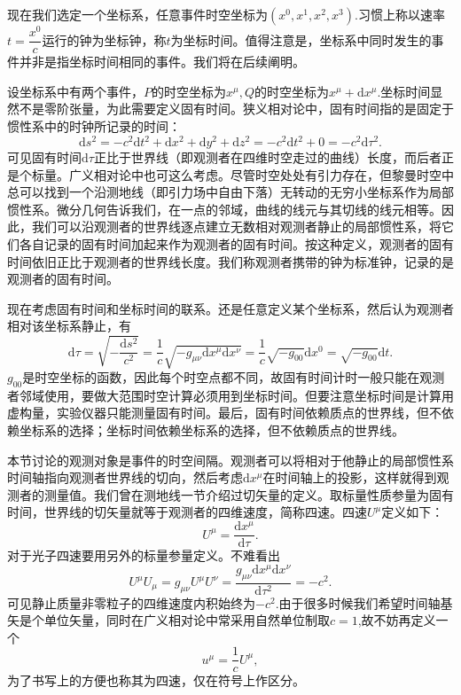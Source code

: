 \documentclass[11pt, a4paper, oneside, onecolumn]{ctexart}
\numberwithin{equation}{subsection}
\begin{document}
现在我们选定一个坐标系，任意事件时空坐标为$\left(x^{0},x^{1},x^{2},x^{3}\right)$.习惯上称以速率$t=\dfrac{x^{0}}{c}$运行的钟为坐标钟，称$t$为坐标时间。值得注意是，坐标系中同时发生的事件并非是指坐标时间相同的事件。我们将在后续阐明。

设坐标系中有两个事件，$P$的时空坐标为$x^{\mu},Q$的时空坐标为$x^{\mu}+\mathrm{d}x^{\mu}$.坐标时间显然不是零阶张量，为此需要定义固有时间。狭义相对论中，固有时间指的是固定于惯性系中的时钟所记录的时间：
\begin{equation}
\mathrm{d}s^{2}=-c^{2}\mathrm{d}t^{2}+\mathrm{d}x^{2}+\mathrm{d}y^{2}+\mathrm{d}z^{2}=-c^{2}\mathrm{d}t^{2}+0=-c^{2}\mathrm{d}\tau^{2}.
\end{equation}
可见固有时间$\mathrm{d}\tau$正比于世界线（即观测者在四维时空走过的曲线）长度，而后者正是个标量。广义相对论中也可这么考虑。尽管时空处处有引力存在，但黎曼时空中总可以找到一个沿测地线（即引力场中自由下落）无转动的无穷小坐标系作为局部惯性系。微分几何告诉我们，在一点的邻域，曲线的线元与其切线的线元相等。因此，我们可以沿观测者的世界线逐点建立无数相对观测者静止的局部惯性系，将它们各自记录的固有时间加起来作为观测者的固有时间。按这种定义，观测者的固有时间依旧正比于观测者的世界线长度。我们称观测者携带的钟为标准钟，记录的是观测者的固有时间。

现在考虑固有时间和坐标时间的联系。还是任意定义某个坐标系，然后认为观测者相对该坐标系静止，有
\begin{equation}
\mathrm{d}\tau=\sqrt{-\frac{\mathrm{d}s^{2}}{c^{2}}}=\frac{1}{c}\sqrt{-g_{\mu\nu}\mathrm{d}x^{\mu}\mathrm{d}x^{\nu}}=\frac{1}{c}\sqrt{-g_{00}}\mathrm{d}x^{0}=\sqrt{-g_{00}}\mathrm{d}t.\label{2.1.2}
\end{equation}
$g_{00}$是时空坐标的函数，因此每个时空点都不同，故固有时间计时一般只能在观测者邻域使用，要做大范围时空计算必须用到坐标时间。但要注意坐标时间是计算用虚构量，实验仪器只能测量固有时间。最后，固有时间依赖质点的世界线，但不依赖坐标系的选择；坐标时间依赖坐标系的选择，但不依赖质点的世界线。

本节讨论的观测对象是事件的时空间隔。观测者可以将相对于他静止的局部惯性系时间轴指向观测者世界线的切向，然后考虑$\mathrm{d}x^{\mu}$在时间轴上的投影，这样就得到观测者的测量值。我们曾在测地线一节介绍过切矢量的定义。取标量性质参量为固有时间，世界线的切矢量就等于观测者的四维速度，简称四速。四速$U^{\mu}$定义如下：
\begin{equation}
U^{\mu}=\frac{\mathrm{d}x^{\mu}}{\mathrm{d}\tau}.
\end{equation}
对于光子四速要用另外的标量参量定义。不难看出
\begin{equation}
U^{\mu}U_{\mu}=g_{\mu\nu}U^{\mu}U^{\nu}=\frac{g_{\mu\nu}\mathrm{d}x^{\mu}\mathrm{d}x^{\nu}}{\mathrm{d}\tau^{2}}=-c^{2}.
\end{equation}
可见静止质量非零粒子的四维速度内积始终为$-c^{2}$.由于很多时候我们希望时间轴基矢是个单位矢量，同时在广义相对论中常采用自然单位制取$c=1$,故不妨再定义一个
\begin{equation}
u^{\mu}=\frac{1}{c}U^{\mu},
\end{equation}
为了书写上的方便也称其为四速，仅在符号上作区分。
\end{document}
